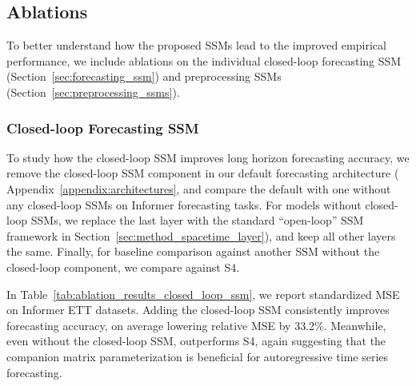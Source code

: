 \subsection{\ourmethod{} Ablations}\label{appendix:ablations}
To better understand how the proposed \ourmethod{} SSMs lead to the improved empirical performance, we include ablations on the individual closed-loop forecasting SSM (Section~\ref{sec:forecasting_ssm}) and preprocessing SSMs (Section~\ref{sec:preprocessing_ssms}). 

\subsubsection{Closed-loop Forecasting SSM}\label{appendix:ablations_closed_loop_ssm}
To study how the closed-loop SSM improves long horizon forecasting accuracy, we remove the closed-loop SSM component in our default \ourmethod{} forecasting architecture (\cf{} Appendix~\ref{appendix:architectures}, and compare the default \ourmethod{} with one without any closed-loop SSMs on Informer forecasting tasks. For models without closed-loop SSMs, we replace the last layer with the standard ``open-loop'' SSM framework in Section~\ref{sec:method_spacetime_layer}), and keep all other layers the same. Finally, for baseline comparison against another SSM without the closed-loop component, we compare against S4. 

In Table~\ref{tab:ablation_results_closed_loop_ssm}, we report standardized MSE on Informer ETT datasets. Adding the closed-loop SSM consistently improves forecasting accuracy, on average lowering relative MSE by 33.2\%. Meanwhile, even without the closed-loop SSM, \ourmethod{} outperforms S4, again suggesting that the companion matrix parameterization is beneficial for autoregressive time series forecasting. 

